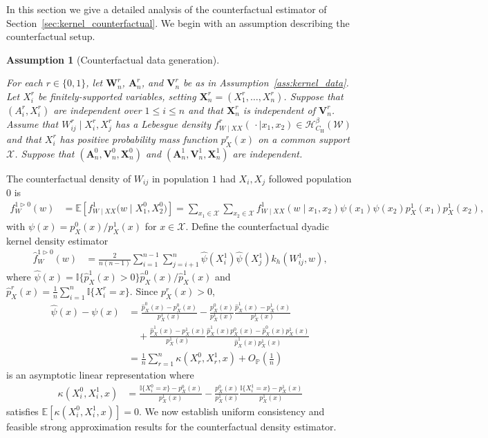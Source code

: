 \documentclass[11pt,lof]{puthesis}
\renewcommand{\P}{\ensuremath{\mathbb{P}}}
\newcommand{\E}{\ensuremath{\mathbb{E}}}
\newcommand{\I}{\ensuremath{\mathbb{I}}}
\newcommand{\rH}{\ensuremath{\mathrm{H}}}
\newcommand{\bW}{\ensuremath{\mathbf{W}}}
\newcommand{\bX}{\ensuremath{\mathbf{X}}}
\newcommand{\bA}{\ensuremath{\mathbf{A}}}
\newcommand{\bV}{\ensuremath{\mathbf{V}}}
\newcommand{\cH}{\ensuremath{\mathcal{H}}}
\newcommand{\cX}{\ensuremath{\mathcal{X}}}
\newcommand{\cW}{\ensuremath{\mathcal{W}}}
\theoremstyle{break}
\newtheorem{assumption}{Assumption}[section]
\theoremstyle{proof}
\begin{document}
In this section we give a detailed analysis of the counterfactual
estimator of Section~\ref{sec:kernel_counterfactual}.
We begin with an assumption describing the counterfactual setup.

\begin{assumption}[Counterfactual data generation]
\label{ass:kernel_app_counterfactual}

For each $r \in \{0,1\}$,
let $\bW_n^r$, $\bA_n^r$, and $\bV_n^r$ be as in
Assumption~\ref{ass:kernel_data}.
Let $X_i^r$ be finitely-supported variables,
setting $\bX_n^r = (X_1^r, \ldots, X_n^r)$.
Suppose that $(A_i^r, X_i^r)$ are
independent over $1 \leq i \leq n$
and that $\bX_n^r$ is independent of $\bV_n^r$.
Assume that $W_{i j}^r \mid X_i^r, X_j^r$
has a Lebesgue density
$f_{W \mid XX}^r(\,\cdot \mid x_1, x_2) \in \cH^\beta_{C_\rH}(\cW)$
and that $X_i^r$ has positive
probability mass function
$p_X^r(x)$ on a common support $\cX$.
Suppose that
$(\bA_n^0, \bV_n^0, \bX_n^0)$
and $(\bA_n^1, \bV_n^1, \bX_n^1)$
are independent.

\end{assumption}

The counterfactual density of $W_{i j}$ in population $1$ had $X_i, X_j$
followed population $0$ is
%
\begin{align*}
f_W^{1 \triangleright 0}(w)
&=
\E\left[
f_{W \mid XX}^1\big(w \mid X_1^0, X_2^0\big)
\right]
= \sum_{x_1 \in \cX}
\sum_{x_2 \in \cX}
f_{W \mid XX}^{1}(w \mid x_1, x_2)
\psi(x_1)
\psi(x_2)
p_X^{1}(x_1)
p_X^{1}(x_2),
\end{align*}
%
with $\psi(x) = p_X^0(x)/p_X^1(x)$ for $x \in \cX$.
Define the counterfactual dyadic kernel density estimator
%
\begin{align*}
\hat f_W^{1 \triangleright 0}(w)
&=
\frac{2}{n(n-1)}
\sum_{i=1}^{n-1}
\sum_{j=i+1}^n
\hat \psi(X_i^1)
\hat \psi(X_j^1)
k_h(W_{i j}^1, w),
\end{align*}
%
where
$\hat\psi(x) = \I\{\hat p_X^{1}(x) > 0\}\hat p_X^{0}(x) / \hat p_X^{1}(x)$
and $\hat p_X^{r}(x) = \frac{1}{n}\sum_{i = 1}^n \I\{X_i^r = x\}$.
Since $p_X^r(x) > 0$,
%
\begin{align*}
\hat\psi(x) - \psi(x)
&=
\frac{\hat p_X^{0}(x) - p_X^0(x)}{p_X^1(x)}
- \frac{p_X^0(x)}{p_X^1(x)}
\frac{\hat p_X^{1}(x) - p_X^1(x)}{p_X^1(x)} \\
&\quad+
\frac{\hat p_X^{1}(x) - p_X^1(x)}{p_X^1(x)}
\frac{\hat p_X^{1}(x) p_X^0(x) - \hat p_X^{0}(x)p_X^1(x)}
{\hat p_X^{1}(x) p_X^1(x)} \\
&=
\frac{1}{n}
\sum_{r=1}^n \kappa(X_r^0, X_r^1, x)
+ O_\P\left(\frac{1}{n}\right)
\end{align*}
%
is an asymptotic linear representation where
%
\begin{align*}
\kappa(X_i^0, X_i^1, x)
&=
\frac{\I\{X_i^0 = x\} - p_X^0(x)}{p_X^1(x)}
- \frac{p_X^0(x)}{p_X^1(x)}
\frac{\I\{X_i^1 = x\} - p_X^1(x)}{p_X^1(x)}
\end{align*}
%
satisfies
$\E[\kappa(X_i^0, X_i^1, x)] = 0$.
We now establish uniform consistency and feasible strong
approximation results for the counterfactual density estimator.
\end{document}
